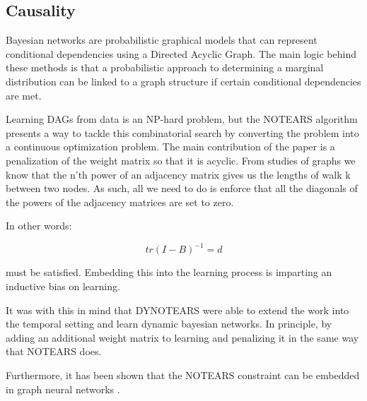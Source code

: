 \documentclass{article}
\begin{document}
\subsection{Causality}

Bayesian networks are probabilistic graphical models that can represent conditional dependencies using a Directed Acyclic Graph. The main logic behind these methods is that a probabilistic approach to determining a marginal distribution can be linked to a graph structure if certain conditional dependencies are met. 

Learning DAGs from data is an NP-hard problem, but the NOTEARS algorithm \cite{zheng_dags_2018} presents a way to tackle this combinatorial search by converting the problem into a continuous optimization problem. The main contribution of the paper is a penalization of the weight matrix so that it is acyclic. From studies of graphs we know that the n'th power of an adjacency matrix gives us the lengths of walk k between two nodes. As such, all we need to do is enforce that all the diagonals of the powers of the adjacency matrices are set to zero. 

In other words:

$$ tr(I-B)^{-1} = d $$

must be satisfied. Embedding this into the learning process is imparting an inductive bias on learning. 

It was with this in mind that DYNOTEARS \cite{pamfil_dynotears_2020} were able to extend the work into the temporal setting and learn dynamic bayesian networks. In principle, by adding an additional weight matrix to learning and penalizing it in the same way that NOTEARS does.

Furthermore, it has been shown that the NOTEARS constraint can be embedded in graph neural networks \cite{lachapelle_gradient-based_2020,yu_dag-gnn_nodate}.
\end{document}
